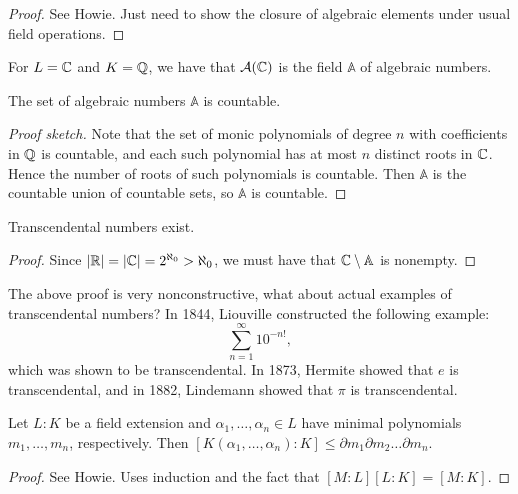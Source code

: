 \begin{proof}
  See Howie. Just need to show the closure of
  algebraic elements under usual field operations.
\end{proof}

\begin{example}
  For $L = \mathbb{C}$ and $K = \mathbb{Q}$, we have that
  $\mathcal{A}(\mathbb{C})$ is
  the field $\mathbb{A}$ of algebraic numbers.
\end{example}

\begin{theorem}
  The set of algebraic numbers $\mathbb{A}$ is countable.
\end{theorem}

\begin{proof}[Proof sketch]
  Note that the set of monic polynomials of degree
  $n$ with coefficients in $\mathbb{Q}$ is countable, and
  each such polynomial has at most $n$ distinct roots
  in $\mathbb{C}$. Hence the number of roots of such polynomials
  is countable. Then $\mathbb{A}$ is the countable
  union of countable sets, so $\mathbb{A}$ is countable.
\end{proof}

\begin{theorem}
  Transcendental numbers exist.
\end{theorem}

\begin{proof}
  Since $|\mathbb{R}| = |\mathbb{C}| = 2^{\aleph_0} > \aleph_0$, we must
  have that $\mathbb{C} \setminus \mathbb{A}$ is nonempty.
\end{proof}

\begin{remark}
  The above proof is very nonconstructive, what about
  actual examples of transcendental numbers? In
  1844, Liouville constructed the following example:
  \[
    \sum_{n = 1}^\infty 10^{-n!},
  \]
  which was shown to be transcendental. In 1873,
  Hermite showed that $e$ is transcendental, and in 1882,
  Lindemann showed that $\pi$ is transcendental.
\end{remark}

\begin{theorem}
  Let $L : K$ be a field extension and
  $\alpha_1, \dots, \alpha_n \in L$ have minimal
  polynomials $m_1, \dots, m_n$, respectively.
  Then
  $[K(\alpha_1, \dots, \alpha_n) : K] \le \partial m_1 \partial m_2 \dots \partial m_n$.
\end{theorem}

\begin{proof}
  See Howie. Uses induction and the fact that
  $[M : L][L : K] = [M : K]$.
\end{proof}

